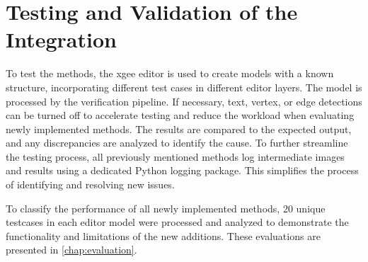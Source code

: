 \section{Testing and Validation of the Integration}
To test the methods, the \acrshort{xgee} editor is used to create models with a known structure, incorporating different test cases in different editor layers. The model is processed by the verification pipeline. If necessary, text, vertex, or edge detections can be turned off to accelerate testing and reduce the workload when evaluating newly implemented methods. The results are compared to the expected output, and any discrepancies are analyzed to identify the cause. To further streamline the testing process, all previously mentioned methods log intermediate images and results using a dedicated Python logging package. This simplifies the process of identifying and resolving new issues.

To classify the performance of all newly implemented methods, 20 unique testcases in each editor model were processed and analyzed to demonstrate the functionality and limitations of the new additions. These evaluations are presented in \autoref{chap:evaluation}.